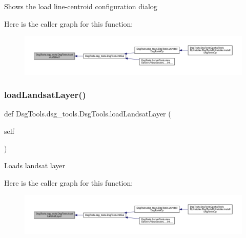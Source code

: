 \begin{DoxyVerb}Shows the load line-centroid configuration dialog
\end{DoxyVerb}
 Here is the caller graph for this function\+:
\nopagebreak
\begin{figure}[H]
\begin{center}
\leavevmode
\includegraphics[width=350pt]{class_dsg_tools_1_1dsg__tools_1_1_dsg_tools_a07e8c58d1e5497299d6c9e0e547ad429_icgraph}
\end{center}
\end{figure}
\mbox{\label{class_dsg_tools_1_1dsg__tools_1_1_dsg_tools_a9210b9ea240c9d2bdf58d4e667090cf7}} 
\subsubsection{\texorpdfstring{load\+Landsat\+Layer()}{loadLandsatLayer()}}
{\footnotesize\ttfamily def Dsg\+Tools.\+dsg\+\_\+tools.\+Dsg\+Tools.\+load\+Landsat\+Layer (\begin{DoxyParamCaption}\item[{}]{self }\end{DoxyParamCaption})}

\begin{DoxyVerb}Loads landsat layer
\end{DoxyVerb}
 Here is the caller graph for this function\+:
\nopagebreak
\begin{figure}[H]
\begin{center}
\leavevmode
\includegraphics[width=350pt]{class_dsg_tools_1_1dsg__tools_1_1_dsg_tools_a9210b9ea240c9d2bdf58d4e667090cf7_icgraph}
\end{center}
\end{figure}
\mbox{\label{class_dsg_tools_1_1dsg__tools_1_1_dsg_tools_a285ff6e653cd985343cdf91acf8080ef}} 
